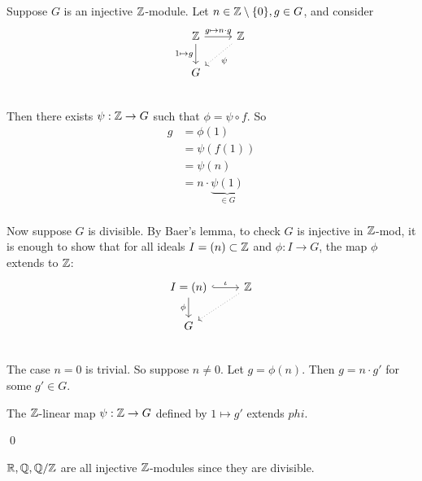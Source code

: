 \documentclass[x11names,reqno,14pt]{extarticle}
\begin{document}
\proof

Suppose $G$ is an injective $\mathbb{Z}$-module. Let $n\in\mathbb{Z}\setminus\{0\}, g \in G$, and consider 
\[
\begin{tikzcd}
\Z\ar[d, "1\mapsto g"'] \ar[r, "g\mapsto n\cdot g "]& \Z \ar[dl, dotted, "\psi"]\\
G & \\
\end{tikzcd}
\]
Then there exists $\psi:\mathbb{Z}\to G$ such that $\phi = \psi \circ f$. So
\begin{align*}
g & = \phi(1) \\ & = \psi(f(1)) \\ & = \psi(n) \\ & = n\cdot\underbrace{\psi(1)}_{\in G} \\
\end{align*}

Now suppose $G$ is divisible. By Baer's lemma, to check $G$ is injective in $\mathbb{Z}$-mod, it is enough to show that for all ideals $I = (n)\subset\mathbb{Z}$ and $\phi:I\to G$, the map $\phi$ extends to $\mathbb{Z}$:
\[
\begin{tikzcd}
I = (n)\ar[r, hook, "\iota"] \ar[d, "\phi"']& \Z \ar[dl, dotted]\\
G & \\
\end{tikzcd}
\]
The case $n = 0$ is trivial. So suppose $n  \neq0$. Let $g=\phi(n)$. Then $g = n\cdot g'$ for some $g' \in G$. 

The $\mathbb{Z}$-linear map $\psi:\mathbb{Z}\to G$ defined by $1\mapsto g'$ extends $phi$. 

\qed

\exm

$\mathbb{R}, \mathbb{Q}, \mathbb{Q}/\mathbb{Z}$ are all injective $\mathbb{Z}$-modules since they are divisible. 
\end{document}
